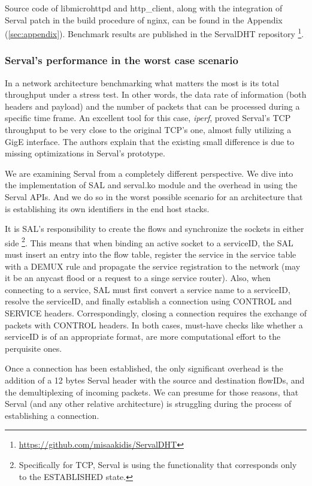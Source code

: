 Source code of libmicrohttpd and http\_client, along with the integration of Serval patch in the build procedure of nginx, can be found in the Appendix (\ref{sec:appendix}).
Benchmark results are published in the ServalDHT repository \footnote{\url{https://github.com/misaakidis/ServalDHT}}.



\subsubsection{Serval's performance in the worst case scenario}
In a network architecture benchmarking what matters the most is its total throughput under a stress test.
In other words, the data rate of information (both headers and payload) and the number of packets that can be processed during a specific time frame.
An excellent tool for this case, \emph{iperf}, proved Serval's TCP throughput to be very close to the original TCP's one, almost fully utilizing a GigE interface. 
The authors explain that the existing small difference is due to missing optimizations in Serval's prototype.

We are examining Serval from a completely different perspective.
We dive into the implementation of SAL and serval.ko module and the overhead in using the Serval APIs.
And we do so in the worst possible scenario for an architecture that is establishing its own identifiers in the end host stacks.

It is SAL's responsibility to create the flows and synchronize the sockets in either side \footnote{Specifically for TCP, Serval is using the functionality that corresponds only to the ESTABLISHED state.}.
This means that when binding an active socket to a serviceID, the SAL must insert an entry into the flow table, register the service in the service table with a DEMUX rule and propagate the service registration to the network (may it be an anycast flood or a request to a singe service router).
Also, when connecting to a service, SAL must first convert a service name to a serviceID, resolve the serviceID, and finally establish a connection using CONTROL and SERVICE headers.
Correspondingly, closing a connection requires the exchange of packets with CONTROL headers.
In both cases, must-have checks like whether a serviceID is of an appropriate format, are more computational effort to the perquisite ones.

Once a connection has been established, the only significant overhead is the addition of a 12 bytes Serval header with the source and destination flowIDs, and the demultiplexing of incoming packets.
We can presume for those reasons, that Serval (and any other relative architecture) is struggling during the process of establishing a connection.

